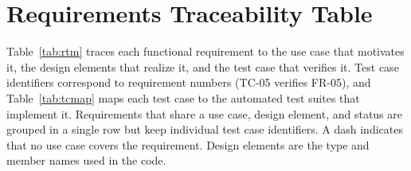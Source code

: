 \documentclass[12pt,letterpaper]{article}
\begin{document}
\section{Requirements Traceability Table}\label{sec:trace}

Table~\ref{tab:rtm} traces each functional requirement to the use case that motivates
it, the design elements that realize it, and the test case that verifies it. Test case
identifiers correspond to requirement numbers (TC-05 verifies FR-05), and
Table~\ref{tab:tcmap} maps each test case to the automated test suites that implement
it. Requirements that share a use case, design element, and status are grouped in a
single row but keep individual test case identifiers. A dash indicates that no use case
covers the requirement. Design elements are the type and member names used in the code.
\end{document}
